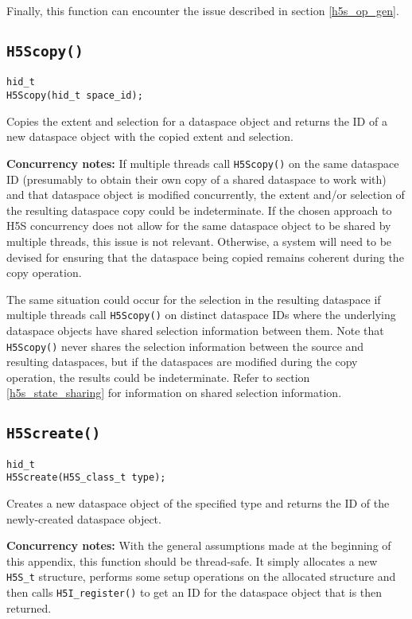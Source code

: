 \documentclass[../HDF5_RFC.tex]{subfiles}
\begin{document}
Finally, this function can encounter the issue described in section \ref{h5s_op_gen}.

\subsection{\texttt{H5Scopy()}}
\label{apdx:h5s_func_h5scopy}

\begin{verbatim}
hid_t
H5Scopy(hid_t space_id);
\end{verbatim}

Copies the extent and selection for a dataspace object and returns the ID of a new
dataspace object with the copied extent and selection.

\textbf{Concurrency notes:} If multiple threads call \texttt{H5Scopy()} on the same dataspace
ID (presumably to obtain their own copy of a shared dataspace to work with) and that dataspace
object is modified concurrently, the extent and/or selection of the resulting dataspace copy
could be indeterminate. If the chosen approach to H5S concurrency does not allow for the
same dataspace object to be shared by multiple threads, this issue is not relevant. Otherwise,
a system will need to be devised for ensuring that the dataspace being copied remains coherent
during the copy operation.

The same situation could occur for the selection in the resulting dataspace if multiple threads
call \texttt{H5Scopy()} on distinct dataspace IDs where the underlying dataspace objects have
shared selection information between them. Note that \texttt{H5Scopy()} never shares the
selection information between the source and resulting dataspaces, but if the dataspaces are
modified during the copy operation, the results could be indeterminate. Refer to section
\ref{h5s_state_sharing} for information on shared selection information.

\subsection{\texttt{H5Screate()}}
\label{apdx:h5s_func_h5screate}

\begin{verbatim}
hid_t
H5Screate(H5S_class_t type);
\end{verbatim}

Creates a new dataspace object of the specified type and returns the ID of the newly-created
dataspace object.

\textbf{Concurrency notes:} With the general assumptions made at the beginning of this
appendix, this function should be thread-safe. It simply allocates a new \texttt{H5S\_t}
structure, performs some setup operations on the allocated structure and then calls
\texttt{H5I\_register()} to get an ID for the dataspace object that is then returned.
\end{document}
